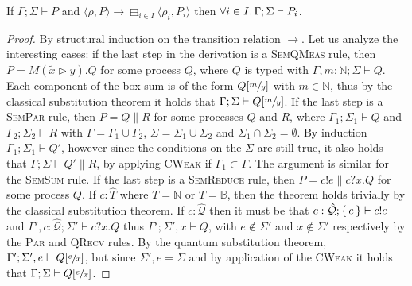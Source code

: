 \begin{theorem}
  If $\Gamma; \Sigma \vdash P$ and $\langle \rho, P \rangle \longrightarrow \boxplus_{i \in I} \langle \rho_i, P_i \rangle$ then
  $\forall i \in I \ldotp \Gamma; \Sigma \vdash P_i$.
\end{theorem}
\begin{proof}
  By structural induction on the transition relation $\longrightarrow$.
  Let us analyze the interesting cases: if the last step in the derivation is a \textsc{SemQMeas} rule, then $P = M(\widetilde{x} \rhd y).Q$ for some process $Q$,
  where $Q$ is typed with $\Gamma, m : \mathbb{N}; \Sigma \vdash Q$. Each component of the box sum is of the form $Q[\sfrac{m}{y}]$ with $m \in \mathbb{N}$, thus
  by the classical substitution theorem it holds that $\Gamma; \Sigma \vdash Q[\sfrac{m}{y}]$.
  If the last step is a \textsc{SemPar} rule, then $P = Q \parallel R$ for some processes $Q$ and $R$, where
  $\Gamma_1; \Sigma_1 \vdash Q$ and $\Gamma_2; \Sigma_2 \vdash R$ with $\Gamma = \Gamma_1 \cup \Gamma_2$, $\Sigma = \Sigma_1 \cup \Sigma_2$ and $\Sigma_1 \cap \Sigma_2 = \emptyset$.
  By induction $\Gamma_1; \Sigma_1 \vdash Q'$, however since the conditions on the $\Sigma$ are still true, it also holds that $\Gamma; \Sigma \vdash Q' \parallel R$, by applying \textsc{CWeak} if $\Gamma_1 \subset \Gamma$.
  The argument is similar for the \textsc{SemSum} rule.
  If the last step is a \textsc{SemReduce} rule, then $P = c!e \parallel c?x.Q$ for some process $Q$. If $c : \hat{T}$ where $T = \mathbb{N}$ or $T = \mathbb{B}$, then
  the theorem holds trivially by the classical substitution theorem.
  If $c : \hat{\mathcal{Q}}$ then it must be that $c : \hat{\mathcal{Q}}; \set{e} \vdash c!e$ and $\Gamma', c : \hat{\mathcal{Q}}; \Sigma' \vdash c?x.Q$ thus $\Gamma'; \Sigma', x \vdash Q$,
  with $e \not\in \Sigma'$ and $x \not\in \Sigma'$ respectively by the \textsc{Par} and \textsc{QRecv} rules. By the quantum substitution theorem, $\Gamma'; \Sigma', e \vdash Q[\sfrac{e}{x}]$,
  but since $\Sigma', e = \Sigma$ and by application of the \textsc{CWeak} it holds that $\Gamma; \Sigma \vdash Q[\sfrac{e}{x}]$.
\end{proof}
